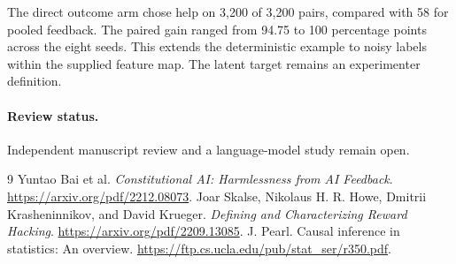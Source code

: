 \documentclass[11pt]{article}
\begin{document}
The direct outcome arm chose help on 3,200 of 3,200 pairs, compared
with 58 for pooled feedback. The paired gain ranged from 94.75 to
100 percentage points across the eight seeds. This extends the
deterministic example to noisy labels within the supplied feature
map. The latent target remains an experimenter definition.

\paragraph{Review status.} Independent manuscript review and a language-model study remain open.

\begin{thebibliography}{9}
 Yuntao Bai et al. \emph{Constitutional AI: Harmlessness from AI Feedback}.
\url{https://arxiv.org/pdf/2212.08073}.
 Joar Skalse, Nikolaus H. R. Howe, Dmitrii Krasheninnikov,
and David Krueger. \emph{Defining and Characterizing Reward Hacking}.
\url{https://arxiv.org/pdf/2209.13085}.
 J. Pearl. Causal inference in statistics: An overview.
\url{https://ftp.cs.ucla.edu/pub/stat_ser/r350.pdf}.
\end{thebibliography}
\end{document}
